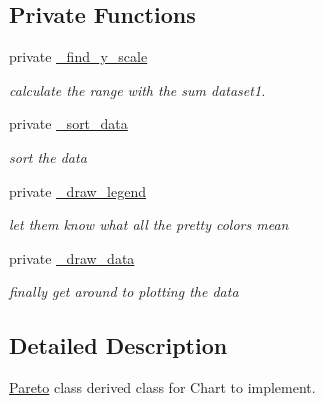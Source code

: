 \subsection*{Private Functions}
\label{_amgrp8d29cff216bafa3117e21883ea7c6b5f}
 \begin{DoxyCompactItemize}
\item 
private \hyperlink{classChart_1_1Pareto_aada3c837beb06c742e78aeb6f7e5c980}{\_\-find\_\-y\_\-scale}
\begin{DoxyCompactList}\small\item\em calculate the range with the sum dataset1. \item\end{DoxyCompactList}\item 
\hypertarget{classChart_1_1Pareto_a83a7720b581c63c2e11a96d78e8d3c14}{
private \hyperlink{classChart_1_1Pareto_a83a7720b581c63c2e11a96d78e8d3c14}{\_\-sort\_\-data}}
\label{classChart_1_1Pareto_a83a7720b581c63c2e11a96d78e8d3c14}

\begin{DoxyCompactList}\small\item\em sort the data \item\end{DoxyCompactList}\item 
\hypertarget{classChart_1_1Pareto_aa6cf49aca8b5b3ac4efd227d06fbebf9}{
private \hyperlink{classChart_1_1Pareto_aa6cf49aca8b5b3ac4efd227d06fbebf9}{\_\-draw\_\-legend}}
\label{classChart_1_1Pareto_aa6cf49aca8b5b3ac4efd227d06fbebf9}

\begin{DoxyCompactList}\small\item\em let them know what all the pretty colors mean \item\end{DoxyCompactList}\item 
\hypertarget{classChart_1_1Pareto_a0e16be0bd97fd6c95bb16fc684e137c7}{
private \hyperlink{classChart_1_1Pareto_a0e16be0bd97fd6c95bb16fc684e137c7}{\_\-draw\_\-data}}
\label{classChart_1_1Pareto_a0e16be0bd97fd6c95bb16fc684e137c7}

\begin{DoxyCompactList}\small\item\em finally get around to plotting the data \item\end{DoxyCompactList}\end{DoxyCompactItemize}


\subsection{Detailed Description}
\hyperlink{classChart_1_1Pareto}{Pareto} class derived class for Chart to implement. 

